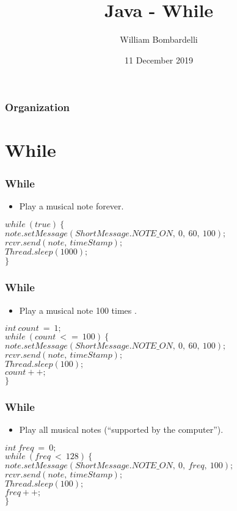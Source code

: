 \documentclass{beamer}
\title[Java]{Java - While}
\author[W. Bombardelli]{William Bombardelli}
\institute[Schweizerschule Mexiko]
{
	\vskip 12pt
	Schweizerschule Mexiko, Ciudad de México, Mexico \\
	\texttt{\url{https://github.com/wbombardellis/java-unterricht}}
}
\date{11 December 2019}
\newcommand{\cindent}{\hskip20pt}
\begin{document}
	\begin{frame}
		\titlepage
	\end{frame}
	
	\begin{frame}
		\frametitle{Organization}
		\tableofcontents
	\end{frame}

	\section{While}
	\begin{frame}
		\frametitle{While}
		\begin{itemize}
			\item Play a musical note forever.
		\end{itemize}
		\pause
		$while\ (true)\ \{$\\
			\cindent $note.setMessage(ShortMessage.NOTE\_ON,\ 0,\ 60,\ 100);$\\
			\cindent $rcvr.send(note,\ timeStamp);$\\
			\cindent $Thread.sleep(1000);$\\
		$\}$\\
	\end{frame}

	\begin{frame}
		\frametitle{While}
		\begin{itemize}
			\item Play a musical note 100 times	.
		\end{itemize}
		\pause
		$int\ count\ =\ 1;$\\
		$while\ (count\ <=\ 100)\ \{$\\
			\cindent $note.setMessage(ShortMessage.NOTE\_ON,\ 0,\ 60,\ 100);$\\
			\cindent $rcvr.send(note,\ timeStamp);$\\
			\cindent $Thread.sleep(100);$\\
			\cindent $count++;$\\
		$\}$\\
	\end{frame}

	\begin{frame}
		\frametitle{While}
		\begin{itemize}
			\item Play all musical notes (``supported by the computer'').
		\end{itemize}
		\pause
		$int\ freq\ =\ 0;$\\
		$while\ (freq\ <\ 128)\ \{$\\
			\cindent $note.setMessage(ShortMessage.NOTE\_ON,\ 0,\ freq,\ 100);$\\
			\cindent $rcvr.send(note,\ timeStamp);$\\
			\cindent $Thread.sleep(100);$\\
			\cindent $freq++;$\\
		$\}$\\
	\end{frame}
\end{document}
